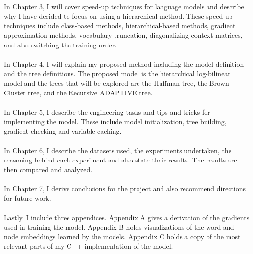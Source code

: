 \paragraph{}
In Chapter 3, I will cover speed-up techniques for language models and describe why I have decided to focus on using a hierarchical method. These speed-up techniques include class-based methods, hierarchical-based methods, gradient approximation methods, vocabulary truncation, diagonalizing context matrices, and also switching the training order.

\paragraph{}
In Chapter 4, I will explain my proposed method including the model definition and the tree definitions. The proposed model is the hierarchical log-bilinear model and the trees that will be explored are the Huffman tree, the Brown Cluster tree, and the Recursive ADAPTIVE tree.

\paragraph{}
In Chapter 5, I describe the engineering tasks and tips and tricks for implementing the model. These include model initialization, tree building, gradient checking and variable caching.

\paragraph{}
In Chapter 6, I describe the datasets used, the experiments undertaken, the reasoning behind each experiment and also state their results. The results are then compared and analyzed. 

\paragraph{}
In Chapter 7, I derive conclusions for the project and also recommend directions for future work.

\paragraph{}
Lastly, I include three appendices. Appendix A gives a derivation of the gradients used in training the model. Appendix B holds visualizations of the word and node embeddings learned by the models. Appendix C holds a copy of the most relevant parts of my C++ implementation of the model.
